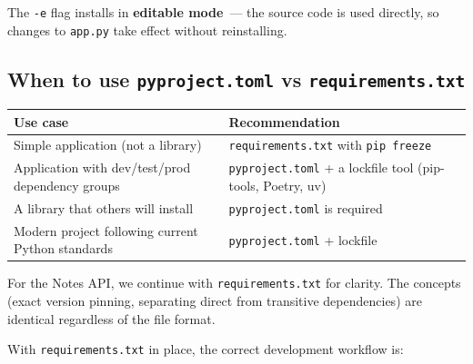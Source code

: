 \noindent{}The \texttt{-e} flag installs in \textbf{editable mode}~--- the source code is used directly, so changes to \texttt{app.py} take effect without reinstalling.


\subsection*{\texorpdfstring{When to use \texttt{pyproject.toml} vs \texttt{requirements.txt}}{When to use pyproject.toml vs requirements.txt}}\label{12-dependency-declaration:when-to-use-pyprojecttoml-vs-requirementstxt}

{\def\LTcaptype{none} %
\begin{longtable}[]{@{}
  >{\raggedright\arraybackslash}p{}
  >{\raggedright\arraybackslash}p{}@{}}
\toprule\noalign{}
\begin{minipage}[b]{\linewidth}\raggedright
Use case
\end{minipage} & \begin{minipage}[b]{\linewidth}\raggedright
Recommendation
\end{minipage} \\
\midrule\noalign{}
\endhead
\bottomrule\noalign{}
\endlastfoot
Simple application (not a library) & \texttt{requirements.txt} with \texttt{pip\ freeze} \\
Application with dev/test/prod dependency groups & \texttt{pyproject.toml} + a lockfile tool (pip-tools, Poetry, uv) \\
A library that others will install & \texttt{pyproject.toml} is required \\
Modern project following current Python standards & \texttt{pyproject.toml} + lockfile \\
\end{longtable}
}

For the Notes API, we continue with \texttt{requirements.txt} for clarity. The concepts (exact version pinning, separating direct from transitive dependencies) are identical regardless of the file format.

\label{12-dependency-declaration:the-updated-development-workflow}

With \texttt{requirements.txt} in place, the correct development workflow is:

